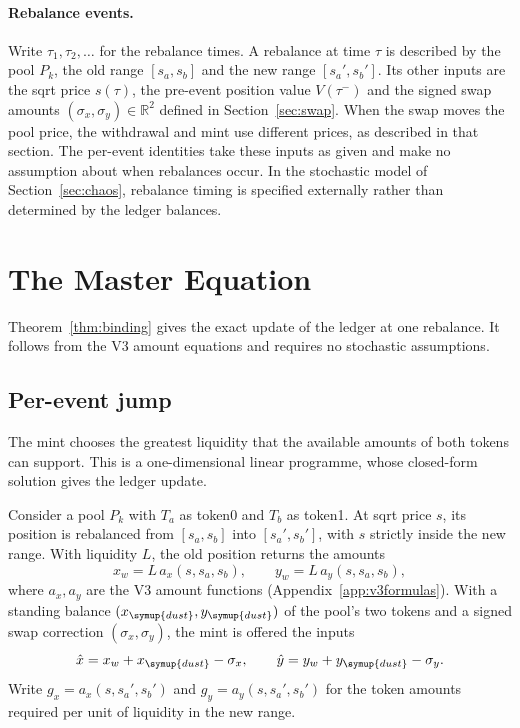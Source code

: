 \documentclass[11pt,a4paper]{article}
\theoremstyle{siphon}
\begin{document}
\paragraph{Rebalance events.} Write $\tau_1, \tau_2, \ldots$ for the rebalance times. A rebalance at time $\tau$ is described by the pool $P_k$, the old range $[s_a, s_b]$ and the new range $[s_a', s_b']$. Its other inputs are the sqrt price $s(\tau)$, the pre-event position value $V(\tau^-)$ and the signed swap amounts $(\sigma_x, \sigma_y) \in \mathbb{R}^2$ defined in Section~\ref{sec:swap}. When the swap moves the pool price, the withdrawal and mint use different prices, as described in that section. The per-event identities take these inputs as given and make no assumption about when rebalances occur. In the stochastic model of Section~\ref{sec:chaos}, rebalance timing is specified externally rather than determined by the ledger balances.

\section{The Master Equation}\label{sec:masterequation}

Theorem~\ref{thm:binding} gives the exact update of the ledger at one rebalance. It follows from the V3 amount equations and requires no stochastic assumptions.

\subsection{Per-event jump}\label{sec:perevent}

The mint chooses the greatest liquidity that the available amounts of both tokens can support. This is a one-dimensional linear programme, whose closed-form solution gives the ledger update.

Consider a pool $P_k$ with $T_a$ as token0 and $T_b$ as token1. At sqrt price $s$, its position is rebalanced from $[s_a, s_b]$ into $[s_a', s_b']$, with $s$ strictly inside the new range. With liquidity $L$, the old position returns the amounts
\begin{equation}\label{eq:oldamount}
x_w = L\,a_x(s, s_a, s_b), \qquad y_w = L\,a_y(s, s_a, s_b),
\end{equation}
where $a_x, a_y$ are the V3 amount functions (Appendix~\ref{app:v3formulas}). With a standing balance $(x_{\symup{dust}}, y_{\symup{dust}})$ of the pool's two tokens and a signed swap correction $(\sigma_x, \sigma_y)$, the mint is offered the inputs
\begin{equation}\label{eq:avail}
\hat x = x_w + x_{\symup{dust}} - \sigma_x, \qquad \hat y = y_w + y_{\symup{dust}} - \sigma_y.
\end{equation}
Write $g_x = a_x(s, s_a', s_b')$ and $g_y = a_y(s, s_a', s_b')$ for the token amounts required per unit of liquidity in the new range.
\end{document}
